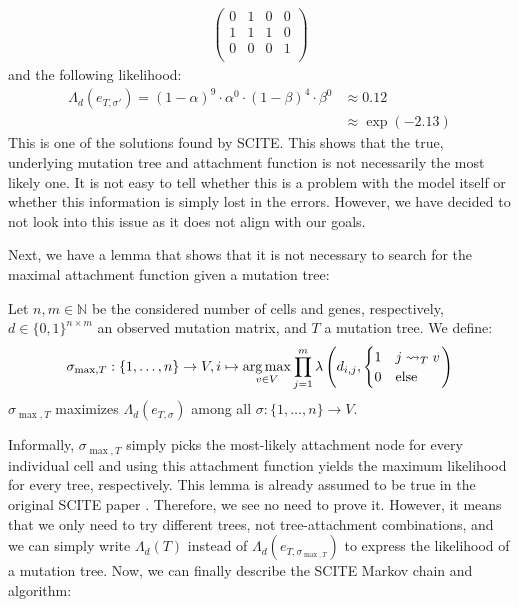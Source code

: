 \begin{example}
\begin{align*}
\begin{pmatrix}
            0 & 1 & 0 & 0 \\
            1 & 1 & 1 & 0 \\
            0 & 0 & 0 & 1 \\
        \end{pmatrix}
    \end{align*}
    and the following likelihood:
    \begin{align*}
        \Lambda_d(e_{T, \sigma'}) = (1-\alpha)^{9} \cdot \alpha^{0} \cdot (1-\beta)^{4} \cdot \beta^{0} &\approx 0.12 \\
        &\approx \exp(-2.13) 
    \end{align*}
    This is one of the solutions found by \ac{SCITE}. This shows that the true, underlying mutation tree and attachment function is not necessarily the most likely one. It is not easy to tell whether this is a problem with the model itself or whether this information is simply lost in the errors. However, we have decided to not look into this issue as it does not align with our goals.
\end{example}

Next, we have a lemma that shows that it is not necessary to search for the maximal attachment function given a mutation tree:

\begin{lemma}
    \label{lem:max_attachment}
    Let $n, m \in \mathbb{N}$ be the considered number of cells and genes, respectively, $d \in \{0,1\}^{n \times m}$ an observed mutation matrix, and $T$ a mutation tree. We define:
    \begin{align*}
        \sigma_{\max, T}: \{1, \dots, n\} \rightarrow V, i \mapsto \operatorname*{arg\,max}_{v \in V} \prod_{j = 1}^m \lambda \left(d_{i,j}, \begin{cases}
            1 & j \leadsto_T v \\
            0 & \mathrm{else} \\
        \end{cases}\right)
    \end{align*}
    $\sigma_{\max, T}$ maximizes $\Lambda_d (e_{T, \sigma})$ among all $\sigma: \{1, \dots, n\} \rightarrow V$.
\end{lemma}

Informally, $\sigma_{\max, T}$ simply picks the most-likely attachment node for every individual cell and using this attachment function yields the maximum likelihood for every tree, respectively. This lemma is already assumed to be true in the original SCITE paper \cite{tree2016}. Therefore, we see no need to prove it. However, it means that we only need to try different trees, not tree-attachment combinations, and we can simply write $\Lambda_d(T)$ instead of $\Lambda_d(e_{T, \sigma_{\max, T}})$ to express the likelihood of a mutation tree. Now, we can finally describe the \ac{SCITE} Markov chain and algorithm:


